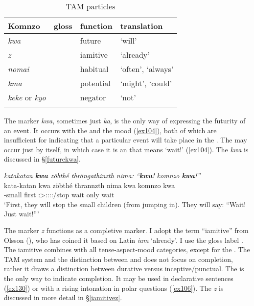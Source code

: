 \begin{table}
\caption{TAM particles}
\label{tam-particles-table}
	\begin{tabularx}{.8\textwidth}{XXXX}
		\lsptoprule
		Komnzo&gloss&function &translation\\
		\midrule
		\emph{kwa}& {\Fut} &future &`will'\\
		\emph{z}& {\Iam} &iamitive &`already'\\
		\emph{nomai}&\Hab{} &habitual &`often', `always'\\
		\emph{kma}&{\Pot} &potential &`might', `could'\\
		\emph{keke} or \emph{kyo}&{\Neg} &negator &`not'\\
		\lspbottomrule
	\end{tabularx}
\end{table}%

The  marker \emph{kwa}, sometimes just \emph{ka}, is the only way of expressing the futurity of an event. It occurs with the   and the  mood (\ref{ex104}), both of which are insufficient for indicating that a particular event will take place in the . The  may occur just by itself, in which case it is an  that means `wait!' (\ref{ex104}). The   \emph{kwa} is discussed in {\S}\ref{futurekwa}.

\begin{exe}
	\ex \emph{katakatan \textbf{kwa} zöbthé thrängathinzth nima: ``\textbf{kwa}! komnzo \textbf{kwa}!''}\\
	\gll kata-katan kwa zöbthé thrannzth nima kwa komnzo kwa\\
	\Redup-small {\Fut} first \Stpl:\Sbj>\Stpl:\Obj:\Irr:\Pfv:\Venit/stop {\Quot} wait only wait\\
	\trans `First, they will stop the small children (from jumping in). They will say: ``Wait! Just wait!''' 
	\label{ex104}
\end{exe}

The  marker \emph{z} functions as a completive marker. I adopt the term ``iamitive'' from Olsson (\citeyear{Olsson:2013vn}), who has coined it based on Latin \emph{iam} `already'. I use the gloss label {\Iam}. The iamitive combines with all tense-aspect-mood categories, except for the . The TAM system and the distinction between  and  does not focus on completion, rather it draws a distinction between durative versus inceptive/punctual. The   is the only way to indicate completion. It may be used in declarative sentences (\ref{ex130}) or with a rising intonation in polar questions (\ref{ex106}). The  \emph{z} is discussed in more detail in {\S}\ref{iamitivez}.

